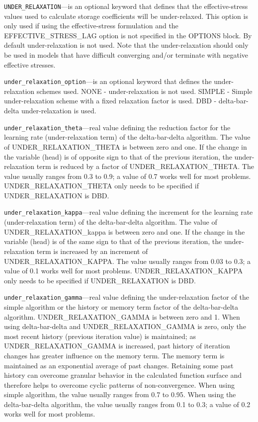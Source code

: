 \begin{description}
\item \texttt{UNDER\_RELAXATION}---is an optional keyword that defines that the effective-stress values used to calculate storage coefficients will be under-relaxed. This option is only used if using the effective-stress formulation and the EFFECTIVE\_STRESS\_LAG option is not specified in the OPTIONS block. By default under-relaxation is not used.  Note that the under-relaxation should only be used in models that have difficult converging and/or terminate with negative effective stresses.

\item \texttt{under\_relaxation\_option}---is an optional keyword that defines the under-relaxation schemes used.  NONE - under-relaxation is not used. SIMPLE - Simple under-relaxation scheme with a fixed relaxation factor is used.  DBD - delta-bar-delta under-relaxation is used.

\item \texttt{under\_relaxation\_theta}---real value defining the reduction factor for the learning rate (under-relaxation term) of the delta-bar-delta algorithm. The value of UNDER\_RELAXATION\_THETA is between zero and one. If the change in the variable (head) is of opposite sign to that of the previous iteration, the under-relaxation term is reduced by a factor of UNDER\_RELAXATION\_THETA. The value usually ranges from 0.3 to 0.9; a value of 0.7 works well for most problems. UNDER\_RELAXATION\_THETA only needs to be specified if UNDER\_RELAXATION is DBD.

\item \texttt{under\_relaxation\_kappa}---real value defining the increment for the learning rate (under-relaxation term) of the delta-bar-delta algorithm. The value of UNDER\_RELAXATION\_kappa is between zero and one. If the change in the variable (head) is of the same sign to that of the previous iteration, the under-relaxation term is increased by an increment of UNDER\_RELAXATION\_KAPPA. The value usually ranges from 0.03 to 0.3; a value of 0.1 works well for most problems. UNDER\_RELAXATION\_KAPPA only needs to be specified if UNDER\_RELAXATION is DBD.

\item \texttt{under\_relaxation\_gamma}---real value defining the under-relaxation factor of the simple algorithm or the history or memory term factor of the delta-bar-delta algorithm. UNDER\_RELAXATION\_GAMMA is between zero and 1. When using delta-bar-delta and UNDER\_RELAXATION\_GAMMA is zero, only the most recent history (previous iteration value) is maintained; as UNDER\_RELAXATION\_GAMMA is increased, past history of iteration changes has greater influence on the memory term. The memory term is maintained as an exponential average of past changes. Retaining some past history can overcome granular behavior in the calculated function surface and therefore helps to overcome cyclic patterns of non-convergence. When using simple algorithm, the value usually ranges from 0.7 to 0.95. When using the delta-bar-delta algorithm, the value usually ranges from 0.1 to 0.3; a value of 0.2 works well for most problems.


\end{description}
